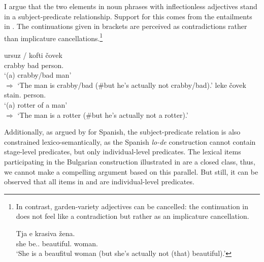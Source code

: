 \documentclass[output=paper]{langscibook}
\begin{document}
I argue that the two elements in noun phrases with inflectionless adjectives stand in a subject-predicate relationship. Support for this comes from the entailments in  \citep[based on][]{VillalbaBartra-Kaufman2010}. The continuations given in brackets are perceived as contradictions rather than implicature cancellations.\footnote{In contrast, garden-variety adjectives can be cancelled: the continuation in  does not feel like a contradiction but rather as an implicature cancellation.

\ea \label{ge-ex-cancel}
\gll Tja e krasiva \v{z}ena. \\
she be.\Prs{}.\Tsg{} beautiful.\F{} woman.\F{} \\
\glt `She is a beaufitul woman (but she's actually not (that) beautiful).'
\z}

\ea
\ea \label{ge-ex-entail}
\gll ursuz / kofti \v{c}ovek \\ %
crabby \phantom{/} bad person.\M{} \\ %
\glt `(a) crabby/bad man' \\ $\Rightarrow$ `The man is crabby/bad (\#but he's actually not crabby/bad).' 
\ex 
\gll leke \v{c}ovek \\ %
stain.\N{} person.\M{}  \\ %
\glt `(a) rotter of a man' \\ $\Rightarrow$ `The man is a rotter (\#but he's actually not a rotter).'
\z 
\z

\noindent Additionally, as argued by \citet{VillalbaBartra-Kaufman2010} for Spanish, the subject-predicate relation is also constrained lexico-semantically, as the Spanish \emph{lo-de} construction cannot contain stage-level predicates, but only individual-level predicates. The lexical items participating in the Bulgarian construction illustrated in  are a closed class, thus, we cannot make a compelling argument based on this parallel. But still, it can be observed that all items in  and  are individual-level predicates. 
\end{document}
